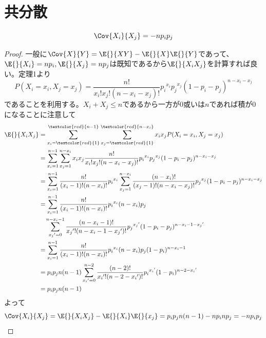     \section{共分散}
        \begin{shadebox}
            \[\Cov{X_i}{X_j} = -np_ip_j\]
        \end{shadebox}
        \begin{proof}
            \quad\par
            一般に$\Cov{X}{Y} = \E{}{XY}  -\E{}{X}\E{}{Y}$であって、$\E{}{X_i} = np_i, \E{}{X_j} = np_j$は既知であるから$\E{}{X_iX_j}$を計算すれば良い。定理1より
            \[P(X_i=x_i,X_j=x_j) = \frac{n!}{x_i!x_j!(n-x_i-x_j)!}{p_i}^{x_i}{p_j}^{x_j}(1-p_i-p_j)^{n-x_i-x_j}\]
            であることを利用する。$X_i+X_j \leq n$であるから一方が0或いは$n$であれば積が0になることに注意して
            \begin{align*}
                \E{}{X_iX_j} &= \sum_{x_i=\textcolor{red}{1}}^{\textcolor{red}{n-1}}{\sum_{x_j=\textcolor{red}{1}}^{\textcolor{red}{n-x_i}}{x_ix_jP(X_i=x_i,X_j=x_j)}}\\
                &= \sum_{x_i=1}^{n-1}{\sum_{x_j=1}^{n-x_i}{x_ix_j\frac{n!}{x_i!x_j!(n-x_i-x_j)!}{p_i}^{x_i}{p_j}^{x_j}(1-p_i-p_j)^{n-x_i-x_j}}}\\
                &= \sum_{x_i=1}^{n-1}{\frac{n!}{(x_i-1)!(n-x_i)!}{p_i}^{x_i}\sum_{x_j=1}^{n-x_i}{\frac{(n-x_i)!}{(x_j-1)!(n-x_i-x_j)!}{p_j}^{x_j}(1-p_i-p_j)^{n-x_i-x_j}}}\\
                &= \sum_{x_i=1}^{n-1} \frac{n!}{(x_i-1)!(n-x_i)!}{p_i}^{x_i}(n-x_i)p_j \\
                &\quad \sum_{{x_j}'=0}^{n-x_i-1}{\frac{(n-x_i-1)!}{{x_j}'!(n-x_i-1-{x_j}')!}{p_j}^{{x_j}'}(1-p_i-p_j)^{n-x_i-1-{x_j}'}}\\
                &= \sum_{x_i=1}^{n-1}{\frac{n!}{(x_i-1)!(n-x_i)!}{p_i}^{x_i}(n-x_i)p_j(1-p_i)^{n-x_i-1}}\\
                &= p_ip_jn(n-1)\sum_{{x_i}'=0}^{n-2}{\frac{(n-2)!}{{x_i}'!(n-2-{x_i}')!}{p_i}^{{x_i}'}(1-p_i)^{n-2-{x_i}'}}\\
                &= p_ip_jn(n-1)
            \end{align*}
            よって
            \[\Cov{X_i}{X_j} = \E{}{X_iX_j} - \E{}{X_i}\E{}{x_j} = p_ip_jn(n-1) - np_inp_j =  -np_ip_j\]
        \end{proof}